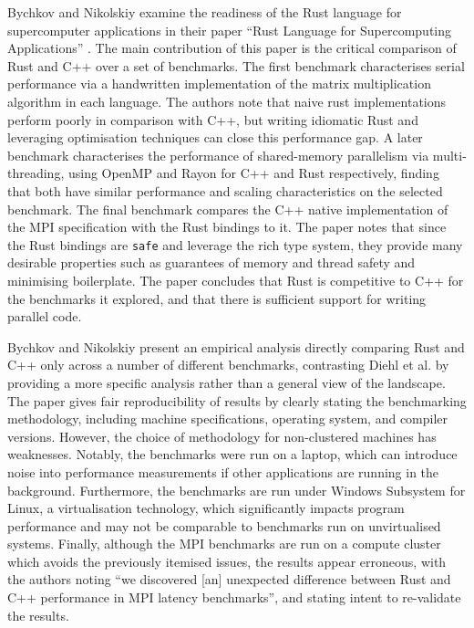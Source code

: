 Bychkov and Nikolskiy examine the readiness of the Rust language for supercomputer applications in their paper ``Rust Language for Supercomputing Applications'' \cite{bychkovRustLanguageSupercomputing2021}. The main contribution of this paper is the critical comparison of Rust and C++ over a set of benchmarks. The first benchmark characterises serial performance via a handwritten implementation of the matrix multiplication algorithm in each language. The authors note that naive rust implementations perform poorly in comparison with C++, but writing idiomatic Rust and leveraging optimisation techniques can close this performance gap. A later benchmark characterises the performance of shared-memory parallelism via multi-threading, using OpenMP and Rayon for C++ and Rust respectively, finding that both have similar performance and scaling characteristics on the selected benchmark. The final benchmark compares the C++ native implementation of the MPI specification with the Rust bindings to it. The paper notes that since the Rust bindings are \texttt{safe} and leverage the rich type system, they provide many desirable properties such as guarantees of memory and thread safety and minimising boilerplate. The paper concludes that Rust is competitive to C++ for the benchmarks it explored, and that there is sufficient support for writing parallel code.

Bychkov and Nikolskiy present an empirical analysis directly comparing Rust and C++ only across a number of different benchmarks, contrasting Diehl et al. by providing a more specific analysis rather than a general view of the landscape. The paper gives fair reproducibility of results by clearly stating the benchmarking methodology, including machine specifications, operating system, and compiler versions. However, the choice of methodology for non-clustered machines has weaknesses. Notably, the benchmarks were run on a laptop, which can introduce noise into performance measurements if other applications are running in the background. Furthermore, the benchmarks are run under Windows Subsystem for Linux, a virtualisation technology, which significantly impacts program performance and may not be comparable to benchmarks run on unvirtualised systems. Finally, although the MPI benchmarks are run on a compute cluster which avoids the previously itemised issues, the results appear erroneous, with the authors noting ``we discovered [an] unexpected difference between Rust and C++ performance in MPI latency benchmarks'', and stating intent to re-validate the results.


